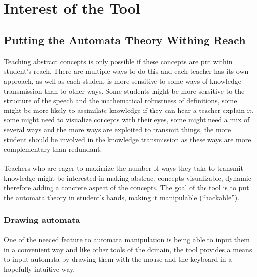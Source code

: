 \documentclass{article}
\begin{document}
\tableofcontents
\begin{sloppypar}


\section{ Interest of the Tool}



\subsection{ Putting the Automata Theory Withing Reach}


\paragraph{}
Teaching abstract concepts is only possible if these concepts are put within student's reach. There are multiple ways to do this and each teacher has its own approach, as well as each student is more sensitive to some ways of knowledge transmission than to other ways. Some students might be more sensitive to the structure of the speech and the mathematical robustness of definitions, some might be more likely to assimilate knowledge if they can hear a teacher explain it, some might need to visualize concepts with their eyes, some might need a mix of several ways and the more ways are exploited to transmit things, the more student should be involved in the knowledge transmission as these ways are more complementary than redundant.

      
\paragraph{}
Teachers who are eager to maximize the number of ways they take to transmit knowledge might be interested in making abstract concepts visualizable, dynamic therefore adding a concrete aspect of the concepts. The goal of the tool is to put the automata theory in student's hands, making it manipulable (``hackable'').
      
      

\subsubsection{ Drawing automata}


\paragraph{}
One of the needed feature to automata manipulation is being able to input them in a convenient way and like other tools of the domain, the tool provides a means to input automata by drawing them with the mouse and the keyboard in a hopefully intuitive way.


\end{sloppypar}
\end{document}
